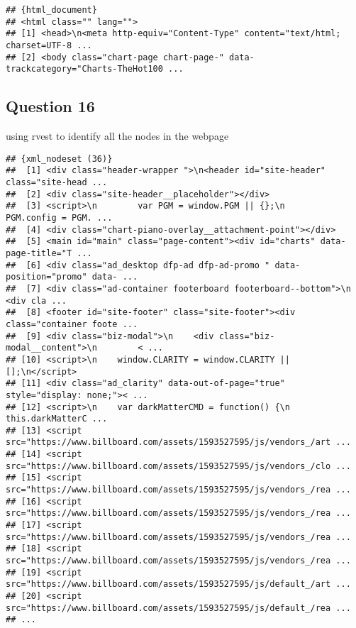 \documentclass[
]{article}
\newenvironment{Shaded}{\begin{snugshade}}{\end{snugshade}}
\newcommand{\KeywordTok}[1]{\textcolor[rgb]{0.13,0.29,0.53}{\textbf{#1}}}
\newcommand{\NormalTok}[1]{#1}
\newcommand{\OperatorTok}[1]{\textcolor[rgb]{0.81,0.36,0.00}{\textbf{#1}}}
\newcommand{\StringTok}[1]{\textcolor[rgb]{0.31,0.60,0.02}{#1}}
\begin{document}
\begin{verbatim}
## {html_document}
## <html class="" lang="">
## [1] <head>\n<meta http-equiv="Content-Type" content="text/html; charset=UTF-8 ...
## [2] <body class="chart-page chart-page-" data-trackcategory="Charts-TheHot100 ...
\end{verbatim}

\hypertarget{question-16}{%
\subsection{Question 16}\label{question-16}}

using rvest to identify all the nodes in the webpage

\begin{Shaded}
\end{Shaded}

\begin{verbatim}
## {xml_nodeset (36)}
##  [1] <div class="header-wrapper ">\n<header id="site-header" class="site-head ...
##  [2] <div class="site-header__placeholder"></div>
##  [3] <script>\n        var PGM = window.PGM || {};\n        PGM.config = PGM. ...
##  [4] <div class="chart-piano-overlay__attachment-point"></div>
##  [5] <main id="main" class="page-content"><div id="charts" data-page-title="T ...
##  [6] <div class="ad_desktop dfp-ad dfp-ad-promo " data-position="promo" data- ...
##  [7] <div class="ad-container footerboard footerboard--bottom">\n    <div cla ...
##  [8] <footer id="site-footer" class="site-footer"><div class="container foote ...
##  [9] <div class="biz-modal">\n    <div class="biz-modal__content">\n        < ...
## [10] <script>\n    window.CLARITY = window.CLARITY || [];\n</script>
## [11] <div class="ad_clarity" data-out-of-page="true" style="display: none;">< ...
## [12] <script>\n    var darkMatterCMD = function() {\n        this.darkMatterC ...
## [13] <script src="https://www.billboard.com/assets/1593527595/js/vendors_/art ...
## [14] <script src="https://www.billboard.com/assets/1593527595/js/vendors_/clo ...
## [15] <script src="https://www.billboard.com/assets/1593527595/js/vendors_/rea ...
## [16] <script src="https://www.billboard.com/assets/1593527595/js/vendors_/rea ...
## [17] <script src="https://www.billboard.com/assets/1593527595/js/vendors_/rea ...
## [18] <script src="https://www.billboard.com/assets/1593527595/js/vendors_/rea ...
## [19] <script src="https://www.billboard.com/assets/1593527595/js/default_/art ...
## [20] <script src="https://www.billboard.com/assets/1593527595/js/default_/rea ...
## ...
\end{verbatim}
\end{document}
